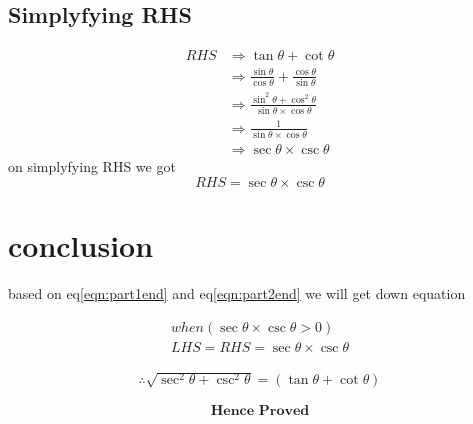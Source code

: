 \documentclass[12pt,twocolumn]{article}
\begin{document}
\subsection*{Simplyfying RHS}
 \begin{align}
  RHS&\Rightarrow \tan{\theta}+\cot{\theta}  \\
     &\Rightarrow  \frac{\sin{\theta}}{\cos{\theta}}+\frac{\cos{\theta}}{\sin{\theta}} \\
     &\Rightarrow \frac{\sin^2{\theta}+\cos^2{\theta}}{\sin{\theta}\times\cos{\theta}}\\
     &\Rightarrow \frac{1}{\sin{\theta}\times\cos{\theta}}\\
     &\Rightarrow \sec{\theta}\times\csc{\theta}
 \end{align}
on simplyfying RHS we got
\begin{equation}
\label{eqn:part2end}
RHS =  \sec{\theta}\times\csc{\theta}
\end{equation}

\section*{conclusion}
 based on eq\ref{eqn:part1end} and eq\ref{eqn:part2end} we will get down equation
 
 \begin{align}
  when (\sec{\theta}\times\csc{\theta} >0 ) \\
 LHS = RHS = \sec{\theta}\times\csc{\theta} 
 \end{align}
 

\begin{align*}
\therefore\sqrt{\sec^2{\theta}+\csc^2{\theta}}=(\tan{\theta}+\cot{\theta})
\end{align*}


\[\textbf{Hence Proved}\]
\end{document}

